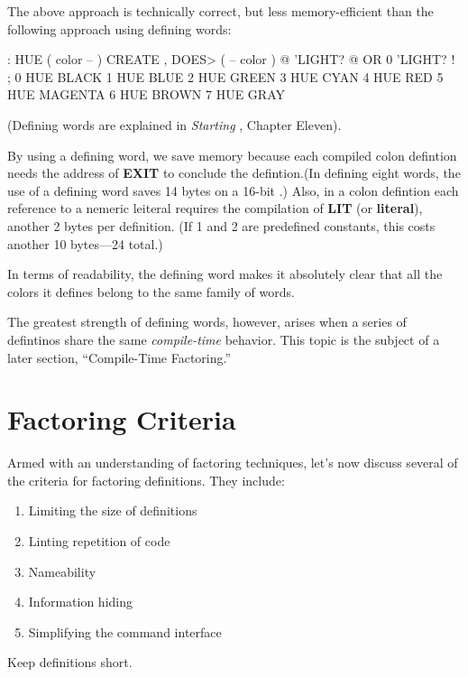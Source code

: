 \noindent The above approach is technically correct, but less memory-efficient than the following approach using defining words:

\begin{Code}
: HUE   ( color -- )  CREATE ,
   DOES>  ( -- color )  @ 'LIGHT? @  OR  0 'LIGHT? ! ;
 0 HUE BLACK         1 HUE BLUE          2 HUE GREEN
 3 HUE CYAN          4 HUE RED           5 HUE MAGENTA
 6 HUE BROWN         7 HUE GRAY
\end{Code}

\noindent 
(Defining words are explained in \emph{Starting \Forth{}}, Chapter Eleven).

By using a defining word, we save memory because each compiled colon
defintion needs the address of \textbf{EXIT} to conclude the
defintion.(In defining eight words, the use of a defining word saves
14 bytes on a 16-bit \Forth{}.) Also, in a colon defintion each reference
to a nemeric leiteral requires the compilation of \textbf{LIT} (or
\textbf{literal}), another 2 bytes per definition. (If 1 and 2 are
predefined constants, this costs another 10 bytes---24 total.)

In terms of readability, the defining word makes it absolutely clear that all the colors it defines belong to the same family of words.

The greatest strength of defining words, however, arises when a series of defintinos share the same \emph{compile-time} behavior. This topic is the subject of a later section, ``Compile-Time Factoring.''

\section{Factoring Criteria}
Armed with an understanding of factoring techniques, let's now discuss several of the criteria for factoring \Forth{} definitions. They include:

\begin{enumerate}
\item Limiting the size of definitions
\item Linting repetition of code
\item Nameability
\item Information hiding
\item Simplifying the command interface
\end{enumerate}

\begin{tip}
Keep definitions short.
\end{tip}

